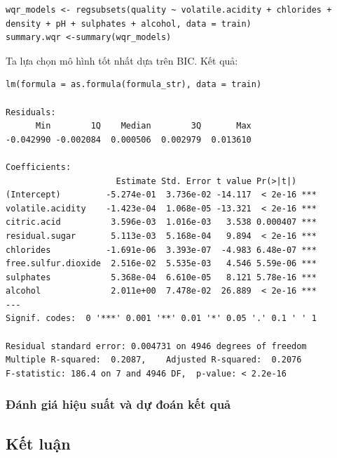 \begin{lstlisting}
wqr_models <- regsubsets(quality ~ volatile.acidity + chlorides + density + pH + sulphates + alcohol, data = train)
summary.wqr <-summary(wqr_models)
\end{lstlisting}
Ta lựa chọn mô hình tốt nhất dựa trên BIC. Kết quả:
\begin{lstlisting}
lm(formula = as.formula(formula_str), data = train)

Residuals:
      Min        1Q    Median        3Q       Max 
-0.042990 -0.002084  0.000506  0.002979  0.013610 

Coefficients:
                      Estimate Std. Error t value Pr(>|t|)    
(Intercept)         -5.274e-01  3.736e-02 -14.117  < 2e-16 ***
volatile.acidity    -1.423e-04  1.068e-05 -13.321  < 2e-16 ***
citric.acid          3.596e-03  1.016e-03   3.538 0.000407 ***
residual.sugar       5.113e-03  5.168e-04   9.894  < 2e-16 ***
chlorides           -1.691e-06  3.393e-07  -4.983 6.48e-07 ***
free.sulfur.dioxide  2.516e-02  5.535e-03   4.546 5.59e-06 ***
sulphates            5.368e-04  6.610e-05   8.121 5.78e-16 ***
alcohol              2.011e+00  7.478e-02  26.889  < 2e-16 ***
---
Signif. codes:  0 '***' 0.001 '**' 0.01 '*' 0.05 '.' 0.1 ' ' 1

Residual standard error: 0.004731 on 4946 degrees of freedom
Multiple R-squared:  0.2087,	Adjusted R-squared:  0.2076 
F-statistic: 186.4 on 7 and 4946 DF,  p-value: < 2.2e-16
\end{lstlisting}


\subsubsection{Đánh giá hiệu suất và dự đoán kết quả}


\subsection{Kết luận}